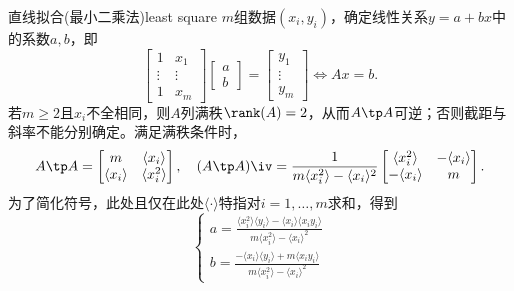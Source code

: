 \begin{example}{直线拟合(最小二乘法)}{least square}
	$m$组数据$(x_i,y_i)$，确定线性关系$y=a+bx$中的系数$a,b$，即 
	\[
		\begin{bmatrix}
			1&x_1\\\vdots&\vdots\\1&x_m
		\end{bmatrix}
		\begin{bmatrix}
			a\\b
		\end{bmatrix}=
		\begin{bmatrix}
			y_1\\\vdots\\y_m
		\end{bmatrix}\iff Ax=b.
	\]
	\newcommand*{\sumi}[1]{\langle{#1}\rangle}
	若$m\geq2$且$x_i$不全相同，则$A$列满秩$\rank(A)=2$，从而$A\tp A$可逆；否则截距与斜率不能分别确定。满足满秩条件时，
	\[
		A\tp A=
		\begin{bmatrix}
			m&\sumi{x_i}\\
			\sumi{x_i}&\sumi{x_i^2}
		\end{bmatrix},\quad
		(A\tp A)\iv=\frac1{m\sumi{x_i^2}-\sumi{x_i}^2}
		\begin{bmatrix}
			\sumi{x_i^2}&-\sumi{x_i}\\
			-\sumi{x_i}&m
		\end{bmatrix}.
	\]
	为了简化符号，此处且仅在此处$\sumi{\cdot}$特指对$i=1,\ldots,m$求和，得到 
	\begin{equation}
		\begin{cases}
			a=\frac{\sumi{x_i^2}\sumi{y_i}-\sumi{x_i}\sumi{x_iy_i}}{m\sumi{x_i^2}-\sumi{x_i}^2}\\[2ex]
			b=\frac{-\sumi{x_i}\sumi{y_i}+m\sumi{x_iy_i}}{m\sumi{x_i^2}-\sumi{x_i}^2}
		\end{cases}
	\end{equation}

\end{example}
